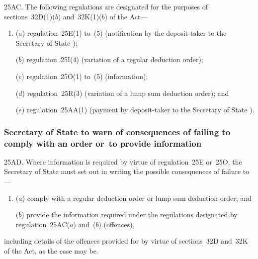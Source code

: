 \documentclass[12pt,a4paper]{article}
\begin{document}
25AC. The following regulations are designated for the purposes of sections~32D(1)($b$)  and~32K(1)($b$)  of the Act—
\begin{enumerate}\item[]
($a$) regulation~25E(1) to~(5) (notification by the deposit-taker to the 
Secretary of State%
);

($b$) regulation~25I(4) (variation of a regular deduction order);

($c$) regulation~25O(1) to~(5) (information);

($d$) regulation~25R(3) (variation of a lump sum deduction order); and

($e$) regulation~25AA(1) (payment by deposit-taker to the 
Secretary of State%
).
\end{enumerate}


\subsubsection[25AD. 
Secretary of State  %
to warn of consequences of failing to comply with an order or~to provide information]{%
Secretary of State  %
to warn of consequences of failing to comply with an order or~to provide information}

25AD.  Where information is required by virtue of regulation~25E or~25O, the 
Secretary of State  %
must set out in writing the possible consequences of failure to—
\begin{enumerate}\item[]
($a$) comply with a regular deduction order or lump sum deduction order; and

($b$) provide the information required under the regulations designated by regulation~25AC($a$)  and~($b$)  (offences),
\end{enumerate}
including details of the offences provided for by virtue of sections~32D and~32K of the   Act, as the case may be.
\end{document}
